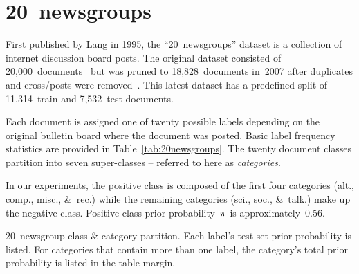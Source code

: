 \section{20~newsgroups}\label{sec:20newsgroups}

First published by Lang in 1995, the ``20~newsgroups'' dataset is a collection of internet discussion board posts.  The original dataset consisted of 20,000~documents~\cite{20newsgroups} but was pruned to 18,828~documents in~2007 after duplicates and cross\-/posts were removed~\cite{Rennie:2007}.   This latest dataset has a predefined split of 11,314~train and 7,532~test documents.

Each document is assigned one of twenty possible labels depending on the original bulletin board where the document was posted.  Basic label frequency statistics are provided in Table~\ref{tab:20newsgroups}. The twenty document classes partition into seven super-classes -- referred to here as \textit{categories}.

In our experiments, the positive class is composed of the first four categories (alt., comp., misc., \&~rec.) while the remaining categories (sci., soc., \&~talk.) make up the negative class. Positive class prior probability~$\pi$ is approximately~0.56.

\begin{table}[t]
  \centering
  \caption{20~newsgroup class \& category partition.  Each label's test set prior probability is listed.  For categories that contain more than one label, the category's total prior probability is listed in the table margin.}\label{tab:20newsgroups}
  
\end{table}

